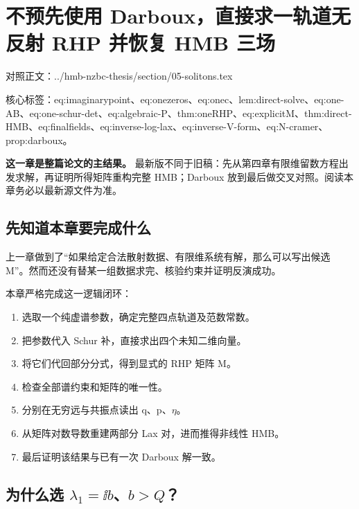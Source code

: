 
\chapter{不预先使用 Darboux，直接求一轨道无反射 RHP 并恢复 HMB 三场}

对照正文：../hmb-nzbc-thesis/section/05-solitons.tex  \par
{\sloppy\raggedright 核心标签：eq:imaginarypoint、eq:onezeros、eq:onec、lem:direct-solve、eq:one-AB、eq:one-schur-det、eq:algebraic-P、thm:oneRHP、eq:explicitM、thm:direct-HMB、eq:finalfields、eq:inverse-log-lax、eq:inverse-V-form、eq:N-cramer、prop:darboux。\par}

\textbf{这一章是整篇论文的主结果。} 最新版不同于旧稿：先从第四章有限维留数方程出发求解，再证明所得矩阵重构完整 HMB；Darboux 放到最后做交叉对照。阅读本章务必以最新源文件为准。\par

\section{先知道本章要完成什么}

上一章做到了“如果给定合法散射数据、有限维系统有解，那么可以写出候选 M”。然而还没有替某一组数据求完、核验约束并证明反演成功。\par

本章严格完成这一逻辑闭环：\par

\begin{enumerate}[leftmargin=2em]
\item 选取一个纯虚谱参数，确定完整四点轨道及范数常数。
\item 把参数代入 Schur 补，直接求出四个未知二维向量。
\item 将它们代回部分分式，得到显式的 RHP 矩阵 M。
\item 检查全部谱约束和矩阵的唯一性。
\item 分别在无穷远与共振点读出 q、p、\ensuremath{\eta}。
\item 从矩阵对数导数重建两部分 Lax 对，进而推得非线性 HMB。
\item 最后证明该结果与已有一次 Darboux 解一致。
\end{enumerate}

\section{为什么选 \texorpdfstring{$\lambda_1=\ii b$、$b>Q$}{lambda1=ib, b>Q}？}
\par

